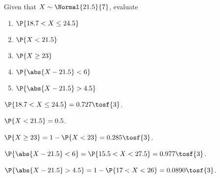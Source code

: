\begin{problem}
    Given that $X \sim \Normal{21.5}{7}$, evaluate
    \begin{enumerate}
        \item $\P{18.7 < X \leq 24.5}$
        \item $\P{X < 21.5}$
        \item $\P{X \geq 23}$
        \item $\P{\abs{X - 21.5} < 6}$
        \item $\P{\abs{X - 21.5} > 4.5}$
    \end{enumerate}
\end{problem}
\begin{solution}
    \begin{ppart}
        $\P{18.7 < X \leq 24.5} = 0.727 \tosf{3}$.
    \end{ppart}
    \begin{ppart}
        $\P{X < 21.5} = 0.5$.
    \end{ppart}
    \begin{ppart}
        $\P{X \geq 23} = 1 - \P{X < 23} = 0.285 \tosf{3}$.
    \end{ppart}
    \begin{ppart}
        $\P{\abs{X - 21.5} < 6} = \P{15.5 < X < 27.5} = 0.977 \tosf{3}$.
    \end{ppart}
    \begin{ppart}
        $\P{\abs{X - 21.5} > 4.5} = 1 - \P{17 < X < 26} = 0.0890 \tosf{3}$.
    \end{ppart}
\end{solution}

